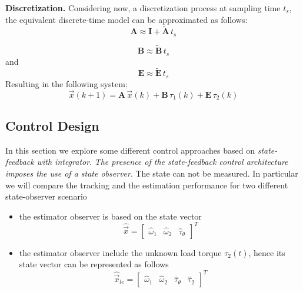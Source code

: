 \documentclass[12pt,a4paper,oneside]{book}
\begin{document}
\begin{onehalfspace}
\textbf{Discretization.} Considering now, a discretization process at sampling time $t_s$, the equivalent 
discrete-time model can be approximated as follows:
\begin{equation}
	\mathbf{A} \approx \mathbf{I} + \tilde{\mathbf{A}}\,t_s
\end{equation}

\begin{equation}
	\mathbf{B} \approx \tilde{\mathbf{B}} \,t_s
\end{equation}
and
\begin{equation}
	\mathbf{E} \approx \tilde{\mathbf{E}} \,t_s
\end{equation}
Resulting in the following system:
\begin{equation}
	\vec{x}(k+1)  = \mathbf{A} \,\vec{x}(k) +\mathbf{B} \,\tau_1(k)+\mathbf{E} 
	\,\tau_2(k)
\end{equation}


\subsection{Control Design} 
In this section we explore some different control approaches based on 
\textit{state-feedback with integrator}. \textit{The presence of the 
	state-feedback control architecture imposes the use of a state observer}. The 
state can not be measured. In particular we will compare the tracking and the 
estimation performance for two different state-observer scenario
\begin{itemize}
	\item[--] the estimator observer is based on the state vector \begin{equation}
		\hat{\vec{x}} = \left[\begin{matrix}\hat{ \omega}_1&\hat{\omega}_2&\hat{\tau}_{\theta} 
		\end{matrix} \right]^T
	\end{equation}
	\item[--] the estimator observer include the unknown load torque $\tau_2(t)$, hence its state vector can be represented as follows \begin{equation}
		\hat{\vec{x}}_{le} = \left[\begin{matrix}\hat{ \omega}_1&\hat{\omega}_2&\hat{\tau}_{\theta}&\hat{\tau}_{2} 
		\end{matrix} \right]^T
	\end{equation}
\end{itemize}


\end{onehalfspace}
\end{document}
